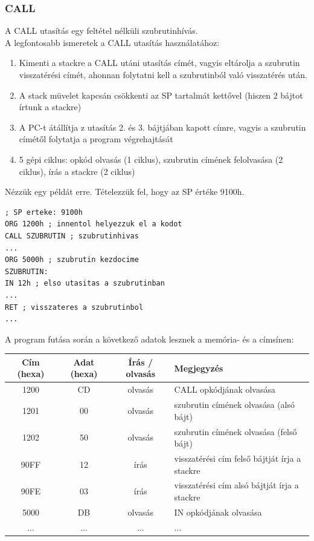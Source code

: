 \documentclass{article}
\begin{document}
\subsubsection{CALL}
A CALL utasítás egy feltétel nélküli szubrutinhívás. \\
A legfontosabb ismeretek a CALL utasítás használatához:
\begin{enumerate}
	\item Kimenti a stackre a CALL utáni utasítás címét, vagyis eltárolja a szubrutin visszatérési címét, ahonnan folytatni kell a szubrutinból való visszatérés után.
	\item A stack müvelet kapcsán csökkenti az SP tartalmát kettővel (hiszen 2 bájtot írtunk a stackre)
	\item A PC-t átállítja z utasítás 2. és 3. bájtjában kapott címre, vagyis a szubrutin címétől folytatja a program végrehajtását
	\item 5 gépi ciklus: opkód olvasás (1 ciklus), szubrutin címének felolvasása (2 ciklus), írás a stackre (2 ciklus)
\end{enumerate}
Nézzük egy példát erre. Tételezzük fel, hogy az SP értéke 9100h.
\begin{lstlisting}[frame=single]
; SP erteke: 9100h
ORG 1200h ; innentol helyezzuk el a kodot
CALL SZUBRUTIN ; szubrutinhivas
...
ORG 5000h ; szubrutin kezdocime
SZUBRUTIN:
IN 12h ; elso utasitas a szubrutinban
...
RET ; visszateres a szubrutinbol
...
\end{lstlisting}
A program futása során a következő adatok lesznek a memória- és a címsínen:
\begin{center}
\begin{tabular}{ |c|c|c|l| } 
 \hline
 Cím (hexa) & Adat (hexa) & Írás / olvasás & Megjegyzés \\ \hline
 1200 & CD & olvasás & CALL opkódjának olvasása \\ \hline
 1201 & 00 & olvasás & szubrutin címének olvasása (alsó bájt) \\ \hline
 1202 & 50 & olvasás & szubrutin címének olvasása (felső bájt) \\ \hline
 90FF & 12 & írás & visszatérési cím felső bájtját írja a stackre \\ \hline
 90FE & 03 & írás & visszatérési cím alsó bájtját írja a stackre \\ \hline
 5000 & DB & olvasás & IN opkódjának olvasása \\ \hline
 ... & ... & ... & ... \\ \hline
\end{tabular}
\end{center}
\end{document}
